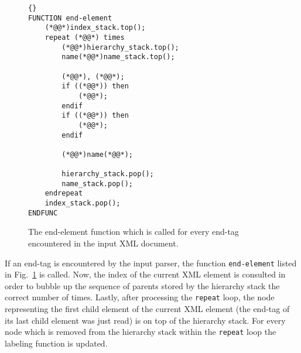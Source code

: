 \documentclass[12pt]{llncs}
\begin{document}
\begin{figure}[tb]
\begin{lstlisting}{}
FUNCTION end-element
	(*@@*)index_stack.top();
	repeat (*@@*) times
		(*@@*)hierarchy_stack.top();
		name(*@@*)name_stack.top();

		(*@@*), (*@@*);
		if ((*@@*)) then
			(*@@*);
		endif
		if ((*@@*)) then
			(*@@*);
		endif

		(*@@*)name(*@@*);

		hierarchy_stack.pop();
		name_stack.pop();
	endrepeat
	index_stack.pop();
ENDFUNC
\end{lstlisting}
\caption{The end-element function which is called for every end-tag encountered in the input XML document.}\label{lst:functionEndElement}
\end{figure}

If an end-tag is encountered by the input parser, the function \verb|end-element| listed in Fig.~\ref{lst:functionEndElement} is called. Now, the index of the current XML element is consulted in order to bubble up the sequence of parents stored by the hierarchy stack the correct number of times. Lastly, after processing the \verb|repeat| loop, the node representing the first child element of the current XML element (the end-tag of its last child element was just read) is on top of the hierarchy stack. For every node  which is removed from the hierarchy stack within the \verb|repeat| loop the labeling function  is updated.
\end{document}
